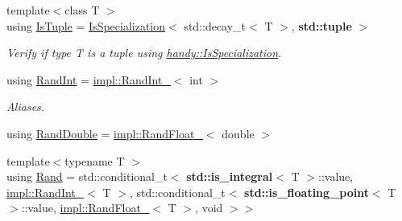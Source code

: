 \begin{DoxyCompactItemize}
{\footnotesize template$<$class T $>$ }\\using \hyperlink{namespacehandy_ac98a0603f9c31f7601694077feba70ec}{Is\+Tuple} = \hyperlink{structhandy_1_1IsSpecialization}{Is\+Specialization}$<$ std\+::decay\+\_\+t$<$ T $>$, {\bf std\+::tuple} $>$
\begin{DoxyCompactList}\small\item\em Verify if type {\ttfamily T} is a tuple using \hyperlink{structhandy_1_1IsSpecialization}{handy\+::\+Is\+Specialization}. \end{DoxyCompactList}\item 
using \hyperlink{group__RandomGroup_gafccf8f163a45086036ca7b3bec3413f5}{Rand\+Int} = \hyperlink{structhandy_1_1impl_1_1RandInt__}{impl\+::\+Rand\+Int\+\_\+}$<$ int $>$
\begin{DoxyCompactList}\small\item\em Aliases. \end{DoxyCompactList}\item 
using \hyperlink{group__RandomGroup_gace607d3788e863aab630c29521cdcf3d}{Rand\+Double} = \hyperlink{structhandy_1_1impl_1_1RandFloat__}{impl\+::\+Rand\+Float\+\_\+}$<$ double $>$
\item 
{\footnotesize template$<$typename T $>$ }\\using \hyperlink{group__RandomGroup_gaa56330e62ab8c2abe507a74d49b70969}{Rand} = std\+::conditional\+\_\+t$<$ {\bf std\+::is\+\_\+integral}$<$ T $>$\+::value, \hyperlink{structhandy_1_1impl_1_1RandInt__}{impl\+::\+Rand\+Int\+\_\+}$<$ T $>$, std\+::conditional\+\_\+t$<$ {\bf std\+::is\+\_\+floating\+\_\+point}$<$ T $>$\+::value, \hyperlink{structhandy_1_1impl_1_1RandFloat__}{impl\+::\+Rand\+Float\+\_\+}$<$ T $>$, void $>$$>$
\end{DoxyCompactItemize}

